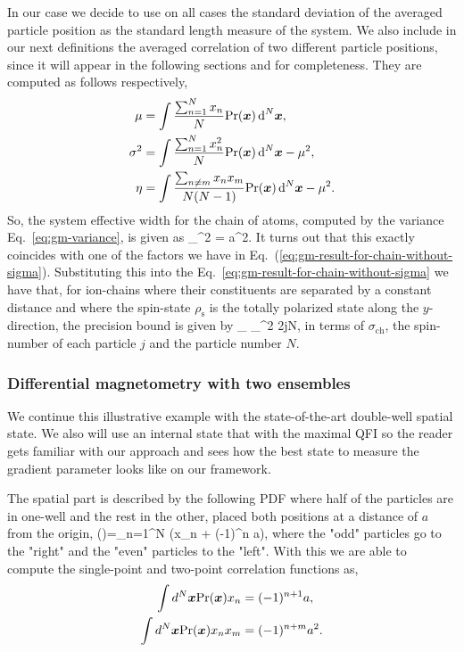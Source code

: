 In our case we decide to use on all cases the standard deviation of the averaged particle position as the standard length measure of the system.
We also include in our next definitions the averaged correlation of two different particle positions, since it will appear in the following sections and for completeness.
They are computed as follows respectively,
\begin{align}
  \mu &= \int \frac{\sum_{n=1}^N x_n}{N} \text{Pr}(\boldsymbol{x}) \, \text{d}^N\boldsymbol{x},
  \label{eq:gm-mean} \\
  \sigma^2 &= \int \frac{\sum_{n=1}^N x_n^2}{N} \text{Pr}(\boldsymbol{x}) \, \text{d}^N\boldsymbol{x}  - \mu^2,
  \label{eq:gm-variance} \\
  \eta & =  \int \frac{\sum_{n\neq m} x_n x_m}{N(N-1)}\text{Pr}(\boldsymbol{x}) \, \text{d}^N\boldsymbol{x} - \mu^2.
  \label{eq:gm-correlation}
\end{align}
So, the system effective width for the chain of atoms, computed by the variance Eq.~\eqref{eq:gm-variance}, is given as
\be
  \sigma_{}^2 = a^2.
  \label{eq:gm-variance-chain}
\ee
It turns out that this exactly coincides with one of the factors we have in Eq.~(\ref{eq:gm-result-for-chain-without-sigma}).
Substituting this into the Eq.~\eqref{eq:gm-result-for-chain-without-sigma} we have that,
for ion-chains where their constituents are separated by a constant distance and where the spin-state $\rho_{\text{s}}$ is the totally polarized state along the $y$-direction, the precision bound is given by
\be
  _{} \leqslant \sigma_{}^2 2jN,
\ee
in terms of $\sigma_{\text{ch}}$, the spin-number of each particle $j$ and the particle number $N$.

\subsubsection{Differential magnetometry with two ensembles}

We continue this illustrative example with the state-of-the-art double-well spatial state.
We also will use an internal state that with the maximal QFI so the reader gets familiar with our approach and sees how the best state to measure the gradient parameter looks like on our framework.

The spatial part is described by the following PDF where half of the particles are in one-well and the rest in the other, placed both positions at a distance of $a$ from the origin,
\be
  \label{eq:gm-double-well-spatial-pdf}
  \prob()=\prod_{n=1}^N \delta(x_n + (-1)^n a),
\ee
where the "odd" particles go to the "right" and the "even" particles to the "left".
With this we are able to compute the single-point and two-point correlation functions as,
\begin{align}
  \int d^N\boldsymbol{x}\text{Pr}(\boldsymbol{x})x_n &= (-1)^{n+1}a,\\
  \label{eq:gm-two-point-function-double-well}
  \int d^N\boldsymbol{x}\text{Pr}(\boldsymbol{x})x_nx_m &= (-1)^{n+m}a^2.
\end{align}

